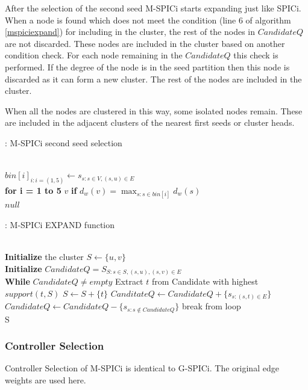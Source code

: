 \documentclass[a4paper,twocolumn,preprint]{elsarticle}
\begin{document}
After the selection of the second seed M-SPICi starts expanding just like SPICi. When a node is found which does not meet the condition (line 6 of algorithm \ref{mspiciexpand}) for including in the cluster, the rest of the nodes in $CandidateQ$ are not discarded. These nodes are included in the cluster based on another condition check. For each node remaining in the $CandidateQ$ this check is performed. If the degree of the node is in the seed partition then this node is discarded as it can form a new cluster. The rest of the nodes are included in the cluster.

When all the nodes are clustered in this way, some isolated nodes remain. These are included in the adjacent clusters of the nearest first seeds or cluster heads.

\begin{algorithm}
	\caption{: M-SPICi second seed selection}\label{mpicisecond}
	\begin{algorithmic}[1]
		 \\
		$bin[i]_{i:i=(1,5)} \gets s_{s:s\in V,(s,u)\in E}$ \\
		\textbf{for i = 1 to 5}
		\State \Return $v$ \textbf{if} $d_w(v)=\max_{s:s\in bin[i]}{d_w(s)}$
		\EndIf\\
		\Return $null$
		\EndProcedure
	\end{algorithmic}
\end{algorithm}
\begin{algorithm}
	\caption{: M-SPICi EXPAND function}\label{mspiciexpand}
	\begin{algorithmic}[1]
		\\
		\textbf{Initialize} the cluster $S \gets \{u,v\}$ \\
		\textbf{Initialize} $CandidateQ = S_{S:s\in S,(s,u),(s,v)\in E}$\\
		\textbf{While} $CandidateQ \neq empty$
		\State Extract $t$ from Candidate with highest $support(t,S)$
		\State $S\gets S+\{t\}$
		\State $CanditateQ \gets CandidateQ + \{s_{s:(s,t)\in E}\}$
		\State $CandidateQ \gets CandidateQ - \{s_{s:s\not\in CandidateQ}\}$
		\Else
		\State break from loop
		\EndIf \\
		\Return S
		\EndProcedure
	\end{algorithmic}
\end{algorithm}

\subsubsection{Controller Selection}
Controller Selection of M-SPICi is identical to G-SPICi. The original edge weights are used here.
\end{document}
